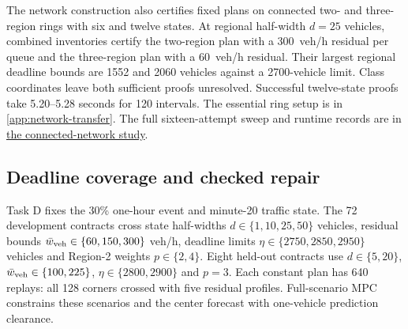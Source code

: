 \documentclass[preprint,12pt]{elsarticle}
\newcommand{\appref}[1]{\ref{#1}}
\newcommand{\reproductiondetails}[1]{\href{https://github.com/AlienEslami/agentic-perimeter-runtime-certification/blob/main/paper/supporting_materials/REPRODUCING_THE_REDUCED_PAPER.md}{#1}}
\begin{document}
The network construction also certifies fixed plans on connected two- and
three-region rings with six and twelve states. At regional half-width
$d=25$ vehicles, combined inventories certify the two-region plan with a
300~veh/h residual per queue and the three-region plan with a
60~veh/h residual. Their largest regional deadline bounds are 1552
and 2060 vehicles against a 2700-vehicle limit. Class coordinates leave
both sufficient proofs unresolved. Successful twelve-state proofs take
5.20--5.28 seconds for 120 intervals. The essential ring setup is in
\appref{app:network-transfer}. The full sixteen-attempt sweep and runtime
records are in \reproductiondetails{the connected-network study}.

\subsection{Deadline coverage and checked repair}
\label{sec:repair-results}

Task D fixes the 30\% one-hour event and minute-20 traffic state. The
72 development contracts cross state half-widths $d\in\{1,10,25,50\}$
vehicles, residual bounds $\bar w_{\rm veh}\in\{60,150,300\}$ veh/h,
deadline limits $\eta\in\{2750,2850,2950\}$ vehicles and Region-2 weights
$p\in\{2,4\}$. Eight held-out contracts use $d\in\{5,20\}$,
$\bar w_{\rm veh}\in\{100,225\}$, $\eta\in\{2800,2900\}$ and $p=3$.
Each constant plan has 640 replays: all 128 corners crossed with five
residual profiles. Full-scenario MPC constrains these scenarios and the
center forecast with one-vehicle prediction clearance.
\end{document}
